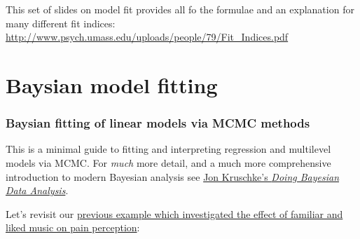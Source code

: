 \documentclass[]{article}
\newenvironment{Shaded}{\begin{snugshade}}{\end{snugshade}}
\newcommand{\DataTypeTok}[1]{\textcolor[rgb]{0.13,0.29,0.53}{#1}}
\newcommand{\KeywordTok}[1]{\textcolor[rgb]{0.13,0.29,0.53}{\textbf{#1}}}
\newcommand{\NormalTok}[1]{#1}
\newcommand{\OperatorTok}[1]{\textcolor[rgb]{0.81,0.36,0.00}{\textbf{#1}}}
\newcommand{\StringTok}[1]{\textcolor[rgb]{0.31,0.60,0.02}{#1}}
\begin{document}
This set of slides on model fit provides all fo the formulae and an explanation
for many different fit indices:
\url{http://www.psych.umass.edu/uploads/people/79/Fit_Indices.pdf}

\hypertarget{bayes-mcmc}{%
\section{Baysian model fitting}\label{bayes-mcmc}}

\hypertarget{baysian-fitting-of-linear-models-via-mcmc-methods}{%
\subsubsection*{Baysian fitting of linear models via MCMC methods}\label{baysian-fitting-of-linear-models-via-mcmc-methods}}

This is a minimal guide to fitting and interpreting regression and multilevel
models via MCMC. For \emph{much} more detail, and a much more comprehensive
introduction to modern Bayesian analysis see
\href{http://www.indiana.edu/~kruschke/DoingBayesianDataAnalysis/}{Jon Kruschke's \emph{Doing Bayesian Data Analysis}}.

Let's revisit our
\protect\hyperlink{pain-music-data}{previous example which investigated the effect of familiar and liked music on pain perception}:

\begin{Shaded}
\end{Shaded}
\end{document}
